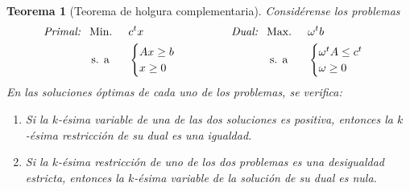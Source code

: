 \documentclass[11pt]{report}
\theoremstyle{mytheorem}
\newtheorem{theorem}{Teorema}
\theoremstyle{mydefinition}
\theoremstyle{myexample}
\newenvironment{ctheorem} %
  {\begin{mdframed}[
        linewidth=3pt,
        linecolor=c2,
        bottomline=false,
        topline=false,
        rightline=false,
        innerrightmargin=0pt,
        innertopmargin=0pt,
        innerbottommargin=0pt,
        innerleftmargin=1em,
        skipabove=\baselineskip]
    \begin{theorem}}
  {\end{theorem}\end{mdframed}}
\begin{document}
\begin{ctheorem}[Teorema de holgura complementaria]
Considérense los problemas
\[\begin{aligned}[t]
\textit{\textit{Primal: }} \ &\textup{Min. } && c^tx \\
& \, \textup{s. a} &&\begin{cases}
    Ax \geq b \\
    x \geq 0 \\
\end{cases}
\end{aligned} \qquad \qquad \begin{aligned}[t]
\textit{\textit{Dual: }} \ &\textup{Max. } && \omega^t b \\
& \; \textup{s. a} &&\begin{cases}
    \omega^t A \leq c^t \\
    \omega \geq 0
\end{cases}
\end{aligned}\]
En las soluciones óptimas de cada uno de los problemas, se verifica:
\begin{enumerate}
    \item Si la $k$-ésima variable de una de las dos soluciones es positiva, entonces la $k$-ésima restricción de su dual es una igualdad.
    \item Si la $k$-ésima restricción de uno de los dos problemas es una desigualdad estricta, entonces la $k$-ésima variable de la solución de su dual es nula.
\end{enumerate}
\end{ctheorem}
\end{document}
